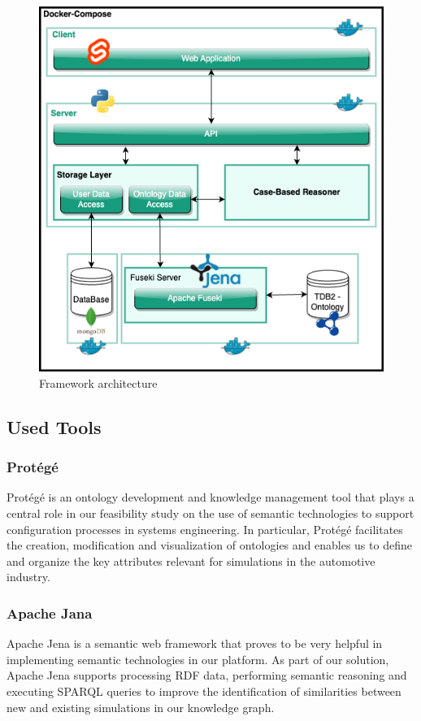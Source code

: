 \begin{figure}[h]
\centering
\includegraphics[scale=0.6]{images/SemanticAssistant-Detailled Architecture.drawio.png}
\caption{\label{fig:frame-archi}  Framework architecture}
\end{figure}


\subsection{Used Tools}
    \subsubsection{Protégé}
    Protégé is an ontology development and knowledge management tool that plays a central role in our feasibility study on the use of semantic technologies to support configuration processes in systems engineering. In particular, Protégé facilitates the creation, modification and visualization of ontologies and enables us to define and organize the key attributes relevant for simulations in the automotive industry.
    
    \subsubsection{Apache Jana}
    Apache Jena is a semantic web framework that proves to be very helpful in implementing semantic technologies in our platform. As part of our solution, Apache Jena supports processing RDF data, performing semantic reasoning and executing SPARQL queries to improve the identification of similarities between new and existing simulations in our knowledge graph.
    
